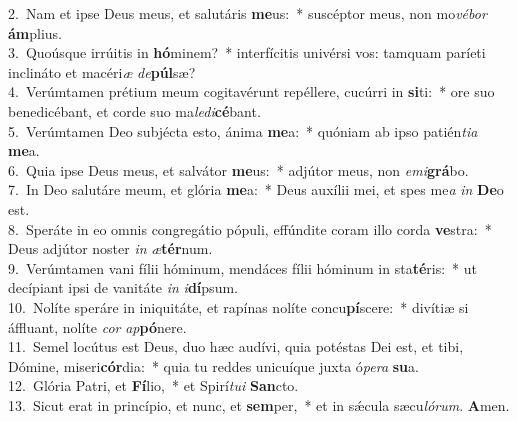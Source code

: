 {2.~}Nam et ipse Deus meus, et salutáris \textbf{me}us:~* suscéptor meus, non mo\textit{vé}\textit{bor} \textbf{ám}plius.\\
{3.~}Quoúsque irrúitis in \textbf{hó}minem?~* interfícitis univérsi vos: tamquam paríeti inclináto et macéri\textit{æ} \textit{de}\textbf{púl}sæ?\\
{4.~}Verúmtamen prétium meum cogitavérunt repéllere, cucúrri in \textbf{si}ti:~* ore suo benedicébant, et corde suo ma\textit{le}\textit{di}\textbf{cé}bant.\\
{5.~}Verúmtamen Deo subjécta esto, ánima \textbf{me}a:~* quóniam ab ipso patién\textit{ti}\textit{a} \textbf{me}a.\\
{6.~}Quia ipse Deus meus, et salvátor \textbf{me}us:~* adjútor meus, non \textit{e}\textit{mi}\textbf{grá}bo.\\
{7.~}In Deo salutáre meum, et glória \textbf{me}a:~* Deus auxílii mei, et spes me\textit{a} \textit{in} \textbf{De}o est.\\
{8.~}Speráte in eo omnis congregátio pópuli, effúndite coram illo corda \textbf{ve}stra:~* Deus adjútor noster \textit{in} \textit{æ}\textbf{tér}num.\\
{9.~}Verúmtamen vani fílii hóminum, mendáces fílii hóminum in sta\textbf{té}ris:~* ut decípiant ipsi de vanitáte \textit{in} \textit{i}\textbf{dí}psum.\\
{10.~}Nolíte speráre in iniquitáte, et rapínas nolíte concu\textbf{pí}scere:~* divítiæ si áffluant, nolíte \textit{cor} \textit{ap}\textbf{pó}nere.\\
{11.~}Semel locútus est Deus, duo hæc audívi, quia potéstas Dei est, et tibi, Dómine, miseri\textbf{cór}dia:~* quia tu reddes unicuíque juxta ó\textit{pe}\textit{ra} \textbf{su}a.\\
{12.~}Glória Patri, et \textbf{Fí}lio,~* et Spirí\textit{tu}\textit{i} \textbf{San}cto.\\
{13.~}Sicut erat in princípio, et nunc, et \textbf{sem}per,~* et in sǽcula sæcu\textit{ló}\textit{rum}. \textbf{A}men.\\
